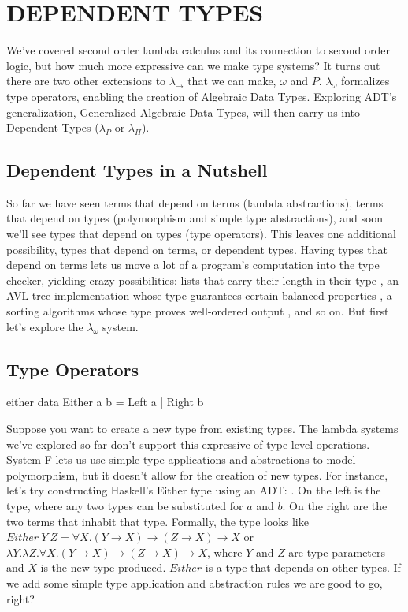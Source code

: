 
\chapter{DEPENDENT TYPES}\label{ch:dependenttypes}
We've covered second order lambda calculus and its connection to second order logic, but how much more expressive can we make type systems? It turns out there are two other extensions to $\lambda_\rightarrow$ that we can make, $\omega $ and $P$. $\lambda_\omega$ formalizes type operators, enabling the creation of Algebraic Data Types. Exploring ADT's generalization, Generalized Algebraic Data Types, will then carry us into Dependent Types ($\lambda_P$ or $\lambda_\Pi$).

\section{Dependent Types in a Nutshell}
So far we have seen terms that depend on terms (lambda abstractions), terms that depend on types (polymorphism and simple type abstractions), and soon we'll see types that depend on types (type operators). This leaves one additional possibility, types that depend on terms, or dependent types. Having types that depend on terms lets us move a lot of a program's computation into the type checker, yielding crazy possibilities: lists that carry their length in their type \cite{vectors}, an AVL tree implementation whose type guarantees certain balanced properties \cite{progOmega}, a sorting algorithms whose type proves well-ordered output \cite{whyDep}, and so on. But first let's explore the $\lambda_\omega $ system.

\section{Type Operators}
\begin{SaveVerbatim}{either}
data Either a b = Left a | Right b
\end{SaveVerbatim}
Suppose you want to create a new type from existing types. The lambda systems we've explored so far don't support this expressive of type level operations. System F lets us use simple type applications and abstractions to model polymorphism, but it doesn't allow for the creation of new types.
For instance, let's try constructing Haskell's Either type using an ADT: . On the left is the type, where any two types can be substituted for $a$ and $b$. On the right are the two terms that inhabit that type. Formally, the type looks like $Either\ Y\ Z = \forall X. (Y \rightarrow X) \rightarrow (Z \rightarrow X) \rightarrow X $ or $\lambda Y. \lambda Z. \forall X. (Y \rightarrow X) \rightarrow (Z \rightarrow X) \rightarrow X $, where $Y$ and $Z$ are type parameters and $X$ is the new type produced. $Either$ is a type that depends on other types. If we add some simple type application and abstraction rules we are good to go, right?

